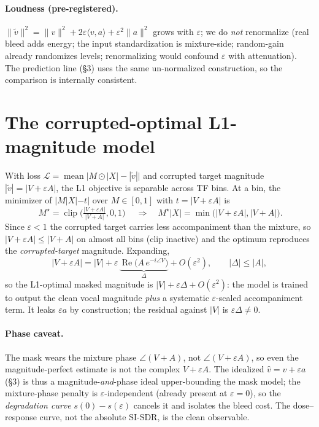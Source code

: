 \documentclass[11pt]{article}
\DeclareMathOperator{\Rea}{Re}
\DeclareMathOperator{\clip}{clip}
\newcommand{\eps}{\varepsilon}
\newcommand{\vt}{\tilde v}
\newcommand{\norm}[1]{\lVert #1 \rVert}
\newcommand{\inner}[2]{\langle #1,#2\rangle}
\begin{document}
\paragraph{Loudness (pre-registered).} $\norm{\vt}^2=\norm{v}^2+2\eps\inner{v}{a}+
\eps^2\norm{a}^2$ grows with $\eps$; we do \emph{not} renormalize (real bleed adds energy;
the input standardization is mixture-side; random-gain already randomizes levels;
renormalizing would confound $\eps$ with attenuation). The prediction line (\S3) uses the
same un-normalized construction, so the comparison is internally consistent.

\section{The corrupted-optimal L1-magnitude model}

With loss $\mathcal L=\operatorname{mean}\big|M\odot|X|-|\vt|\big|$ and corrupted target
magnitude $|\vt|=|V+\eps A|$, the L1 objective is separable across TF bins. At a bin, the
minimizer of $|M|X|-t|$ over $M\in[0,1]$ with $t=|V+\eps A|$ is
\begin{equation}
\boxed{\ M^\star=\clip\!\Big(\tfrac{|V+\eps A|}{|V+A|},0,1\Big)\ }
\quad\Longrightarrow\quad M^\star|X|=\min\big(|V+\eps A|,|V+A|\big).
\end{equation}
Since $\eps<1$ the corrupted target carries less accompaniment than the mixture, so
$|V+\eps A|\le|V+A|$ on almost all bins (clip inactive) and the optimum reproduces the
\emph{corrupted-target} magnitude. Expanding,
\begin{equation}
|V+\eps A| = |V| + \eps\,\underbrace{\Rea\!\big(A\,e^{-i\angle V}\big)}_{\Delta}
    + O(\eps^2),\qquad |\Delta|\le|A|,
\end{equation}
so the L1-optimal masked magnitude is $|V|+\eps\Delta+O(\eps^2)$: the model is trained to
output the clean vocal magnitude \emph{plus} a systematic $\eps$-scaled accompaniment term.
It leaks $\eps a$ by construction; the residual against $|V|$ is $\eps\Delta\ne0$.

\paragraph{Phase caveat.} The mask wears the mixture phase $\angle(V+A)$, not
$\angle(V+\eps A)$, so even the magnitude-perfect estimate is not the complex $V+\eps A$.
The idealized $\hat v=v+\eps a$ (\S3) is thus a magnitude-\emph{and}-phase ideal upper-bounding
the mask model; the mixture-phase penalty is $\eps$-independent (already present at
$\eps=0$), so the \emph{degradation curve} $s(0)-s(\eps)$ cancels it and isolates the bleed
cost. The dose--response curve, not the absolute SI-SDR, is the clean observable.
\end{document}
